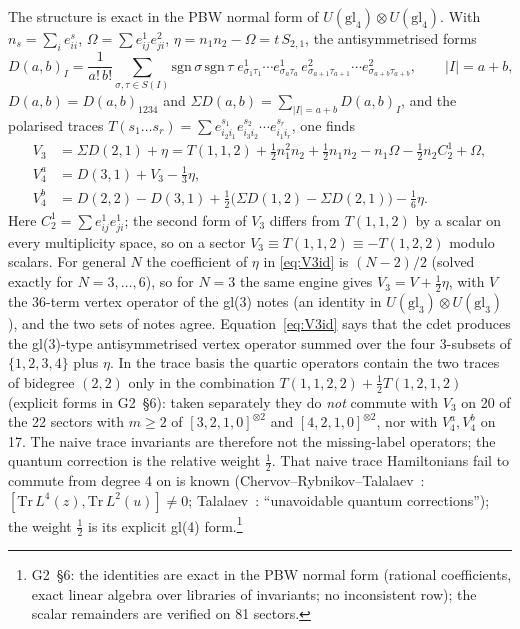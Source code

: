 \documentclass[11pt]{article}
\newcommand{\rg}[2]{\textsf{G#1}~\S#2}
\begin{document}
The structure is exact in the PBW normal form of $U(\mathrm{gl}_4)\otimes U(\mathrm{gl}_4)$.
With $n_s=\sum_ie^s_{ii}$, $\Omega=\sum e^1_{ij}e^2_{ji}$, $\eta=n_1n_2-\Omega=t\,S_{2,1}$, the antisymmetrised forms
\[
D(a,b)_I=\frac1{a!\,b!}\sum_{\sigma,\tau\in S(I)}\mathrm{sgn}\,\sigma\,\mathrm{sgn}\,\tau\;e^1_{\sigma_1\tau_1}\cdots e^1_{\sigma_a\tau_a}\,e^2_{\sigma_{a+1}\tau_{a+1}}\cdots e^2_{\sigma_{a+b}\tau_{a+b}},\qquad|I|=a+b,
\]
$D(a,b)=D(a,b)_{1234}$ and $\Sigma D(a,b)=\sum_{|I|=a+b}D(a,b)_I$, and the polarised traces $T(s_1\dots s_r)=\sum e^{s_1}_{i_2i_1}e^{s_2}_{i_3i_2}\cdots e^{s_r}_{i_1i_r}$, one finds
\begin{align}
V_3&=\Sigma D(2,1)+\eta=T(1,1,2)+\tfrac12n_1^2n_2+\tfrac12n_1n_2-n_1\Omega-\tfrac12n_2C_2^{1}+\Omega,\label{eq:V3id}\\
V_4^{a}&=D(3,1)+V_3-\tfrac13\eta,\label{eq:V4aid}\\
V_4^{b}&=D(2,2)-D(3,1)+\tfrac12\big(\Sigma D(1,2)-\Sigma D(2,1)\big)-\tfrac16\eta.\label{eq:V4bid}
\end{align}
Here $C_2^1=\sum e^1_{ij}e^1_{ji}$; the second form of $V_3$ differs from $T(1,1,2)$ by a scalar on every multiplicity space, so on a sector $V_3\equiv T(1,1,2)\equiv-T(1,2,2)$ modulo scalars.
For general $N$ the coefficient of $\eta$ in \eqref{eq:V3id} is $(N-2)/2$ (solved exactly for $N=3,\dots,6$), so for $N=3$ the same engine gives $V_3=V+\tfrac12\eta$, with $V$ the 36-term vertex operator of the gl(3) notes (an identity in $U(\mathrm{gl}_3)\otimes U(\mathrm{gl}_3)$), and the two sets of notes agree.
Equation~\eqref{eq:V3id} says that the cdet produces the gl(3)-type antisymmetrised vertex operator summed over the four 3-subsets of $\{1,2,3,4\}$ plus $\eta$.
In the trace basis the quartic operators contain the two traces of bidegree $(2,2)$ only in the combination $T(1,1,2,2)+\tfrac12T(1,2,1,2)$ (explicit forms in \rg{2}{6}): taken separately they do \emph{not} commute with $V_3$ on 20 of the 22 sectors with $m\ge2$ of $[3,2,1,0]^{\otimes2}$ and $[4,2,1,0]^{\otimes2}$, nor with $V_4^a,V_4^b$ on 17.
The naive trace invariants are therefore not the missing-label operators; the quantum correction is the relative weight $\tfrac12$.
That naive trace Hamiltonians fail to commute from degree 4 on is known (Chervov--Rybnikov--Talalaev~\cite{crt}: $[\mathrm{Tr}\,L^4(z),\mathrm{Tr}\,L^2(u)]\ne0$; Talalaev~\cite{talalaev}: ``unavoidable quantum corrections''); the weight $\tfrac12$ is its explicit gl(4) form.\footnote{\rg{2}{6}: the identities are exact in the PBW normal form (rational coefficients, exact linear algebra over libraries of invariants; no inconsistent row); the scalar remainders are verified on 81 sectors.}
\end{document}

